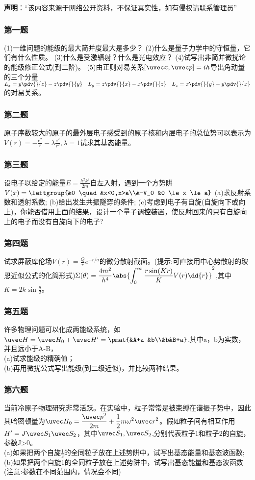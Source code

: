 


\textbf{声明}：“该内容来源于网络公开资料，不保证真实性，如有侵权请联系管理员”

\subsubsection{第一题}
(1)一维问题的能级的最大简并度最大是多少？
(2)什么是量子力学中的守恒量，它们有什么性质。
(3)什么是受激辐射？什么是光电效应？
(4)试写出非简并微扰论的能级修正公式(到二阶)。
(5)由正则对易关系$[\uvec x,\uvec p]=ih$导出角动量的三个分量$\displaystyle L_x=y\pdv{}{z}-z\pdv{}{y}  \quad L_y=z\pdv{}{x}-x\pdv{}{z} \quad L_z=x\pdv{}{y}-y\pdv{}{x}$
的对易关系。
\subsubsection{第二题}
原子序数较大的原子的最外层电子感受到的原子核和内层电子的总位势可以表示为$\displaystyle V(r)=-\frac{e^2}{r}-\lambda\frac{e^2}{r^2},\lambda=1$试求其基态能量。
\subsubsection{第三题}
设电子以给定的能量$E=\frac{h^2k^2}{2m}$自左入射，遇到一个方势阱$V(x)=\leftgroup{&0 \quad &x<0,x>a\\&-V_0 &0 \le x \le a}$
(a)求反射系数和透射系数;
(b)给出发生共振隧穿的条件;
(c)考虑到电子有自旋(自旋向下或向上)，你能否借用上面的结果，设计一个量子调控装置，使反射回来的只有自旋向上的电子而没有自旋向下的电子?
\subsubsection{第四题}
试求屏蔽库伦场$V(r)=\frac{Q}{r}e^{-r/a} $的微分散射截面。(提示:可直接用中心势散射的玻恩近似公式的化简形式)$\displaystyle \Sigma(\theta)=\frac{4m^2}{h^4}\abs{\int_{0}^{\infty}\frac{r\sin(Kr)}{K}V(r)\dd{r}}^2$,其中$\displaystyle K=2k\sin \frac{\theta}{2}$。
\subsubsection{第五题}
许多物理问题可以化成两能级系统，如$\uvec H=\uvec H_0+\uvec H'=\pmat{&A+a &b\\&b&B+a}$,其中a，b为实数，并且远小于A-B，\\
(a)试求能级的精确值；\\
(b)再用微扰公式写出能级(到二级近似)，并比较两种结果。
\subsubsection{第六题}
当前冷原子物理研究非常活跃。在实验中，粒子常常是被束缚在谐振子势中，因此其哈密顿量为$\displaystyle \uvec H_0=\frac{\uvec p^2}{2m}+\frac{1}{2}m\omega^2 \uvec r^2$。假如粒子间有相互作用$H'=J\uvec S_1 \uvec S_2$，其中$\uvec S_1,\uvec S_2$,分别代表粒子1和粒子2的自旋，参数J>0。\\
(a)如果把两个自旋$\frac{1}{2}$的全同粒子放在上述势阱中，试写出基态能量和基态波函数;\\
(b)如果把两个自旋1的全同粒子放在上述势阱中，试写出基态能量和基态波函数(注意:参数在不同范围内，情况会不同)
